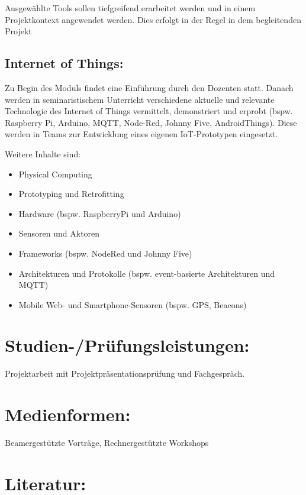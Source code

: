 Ausgewählte Tools sollen tiefgreifend erarbeitet werden und in einem
Projektkontext angewendet werden. Dies erfolgt in der Regel in dem
begleitenden Projekt

\subsection*{Internet of Things:}\label{internet-of-things-1}

Zu Begin des Moduls findet eine Einführung durch den Dozenten statt.
Danach werden in seminaristischem Unterricht verschiedene aktuelle und
relevante Technologie des Internet of Things vermittelt, demonstriert
und erprobt (bspw. Raspberry Pi, Arduino, MQTT, Node-Red, Johnny Five,
AndroidThings). Diese werden in Teams zur Entwicklung eines eigenen
IoT-Prototypen eingesetzt.

Weitere Inhalte sind:

\begin{itemize}
\tightlist
\item
  Physical Computing
\item
  Prototyping und Retrofitting
\item
  Hardware (bspw. RaspberryPi und Arduino)
\item
  Sensoren und Aktoren
\item
  Frameworks (bspw. NodeRed und Johnny Five)
\item
  Architekturen und Protokolle (bspw. event-basierte Architekturen und
  MQTT)
\item
  Mobile Web- und Smartphone-Sensoren (bspw. GPS, Beacons)
\end{itemize}

\section*{Studien-/Prüfungsleistungen:}\label{studien-pruxfcfungsleistungen-24}

Projektarbeit mit Projektpräsentationsprüfung und Fachgespräch.

\section*{Medienformen:}\label{medienformen-17}

Beamergestützte Vorträge, Rechnergestützte Workshops

\section*{Literatur:}\label{literatur-22}

